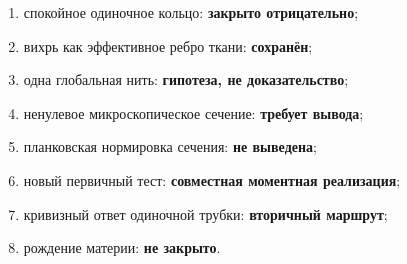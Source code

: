 \begin{protocol}
\begin{enumerate}
 \item спокойное одиночное кольцо: \textbf{закрыто отрицательно};
 \item вихрь как эффективное ребро ткани: \textbf{сохранён};
 \item одна глобальная нить: \textbf{гипотеза, не доказательство};
 \item ненулевое микроскопическое сечение: \textbf{требует вывода};
 \item планковская нормировка сечения: \textbf{не выведена};
 \item новый первичный тест: \textbf{совместная моментная реализация};
 \item кривизный ответ одиночной трубки: \textbf{вторичный маршрут};
 \item рождение материи: \textbf{не закрыто}.
\end{enumerate}
\end{protocol}